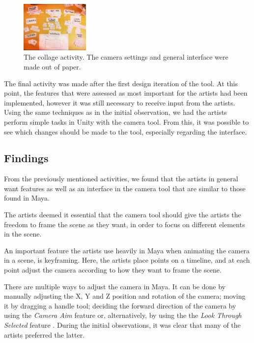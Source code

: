 \begin{figure}[htbp]
\centering
\includegraphics[width=0.3\textwidth]{Pics/labels}
\caption{The collage activity. The camera settings and general interface were made out of paper.}
\label{fig:collage}
\end{figure}

The final activity was made after the first design iteration of the tool. At this point, the features that were assessed as most important for the artists had been implemented, however it was still necessary to receive input from the artists. Using the same techniques as in the initial observation, we had the artists perform simple tasks in Unity with the camera tool. From this, it was possible to see which changes should be made to the tool, especially regarding the interface.

\subsection{Findings} \label{findings}
From the previously mentioned activities, we found that the artists in general want features as well as an interface in the camera tool that are similar to those found in Maya.

The artists deemed it essential that the camera tool should give the artists the freedom to frame the scene as they want, in order to focus on different elements in the scene.

An important feature the artists use heavily in Maya when animating the camera in a scene, is keyframing. Here, the artists place points on a timeline, and at each point adjust the camera according to how they want to frame the scene.

There are multiple ways to adjust the camera in Maya. It can be done by manually adjusting the X, Y and Z position and rotation of the camera; moving it by dragging a handle tool; deciding the forward direction of the camera by using the \textit{Camera Aim} feature \cite{maya_camAim} or, alternatively, by using the the \textit{Look Through Selected} feature \cite{maya_lookThrough}. During the initial observations, it was clear that many of the artists preferred the latter.

